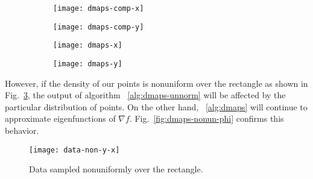 \begin{figure}
  \centering
  \begin{subfigure}[t]{0.45\linewidth}
    \centering
    \texttt{[image: dmaps-comp-x]}
  \end{subfigure}
  \begin{subfigure}[t]{0.45\linewidth}
    \centering
    \texttt{[image: dmaps-comp-y]}
  \end{subfigure}
  \caption[Example of DMAPS' parameterization of
  rectangle]{ \label{fig:dmaps-comp} }
\end{figure}

\begin{figure}
  \centering
  \begin{subfigure}[t]{0.45\linewidth}
    \centering
    \texttt{[image: dmaps-x]}
  \end{subfigure}
  \begin{subfigure}[t]{0.45\linewidth}
    \centering
    \texttt{[image: dmaps-y]}
  \end{subfigure}
  \caption[Comparison of analytical and numerical DMAPS results]{ \label{fig:dmaps-xy} }
\end{figure}

However, if the density of our points is nonuniform over the rectangle
as shown in Fig.~\ref{fig:dmaps-nonun-data}, the output of algorithm
~\ref{alg:dmaps-unnorm} will be affected by the particular
distribution of points. On the other hand, ~\ref{alg:dmaps} will
continue to approximate eigenfunctions of $\nabla
f$. Fig.~\ref{fig:dmaps-nonun-phi} confirms this behavior.

\begin{figure}
    \centering
    \texttt{[image: data-non-y-x]}
    \caption[Data with nonuniform density]{Data sampled nonuniformly over the
      rectangle. \label{fig:dmaps-nonun-data} }
\end{figure}


